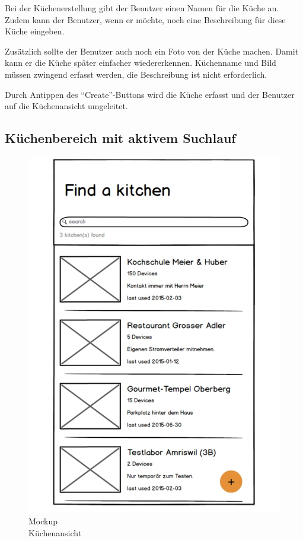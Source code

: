 Bei der Küchenerstellung gibt der Benutzer einen Namen für die Küche an. Zudem kann der Benutzer, wenn er möchte, noch eine Beschreibung für diese Küche eingeben.

Zusätzlich sollte der Benutzer auch noch ein Foto von der Küche machen. Damit kann er die Küche später einfacher wiedererkennen. Küchenname und Bild müssen zwingend erfasst werden, die Beschreibung ist nicht erforderlich.

Durch Antippen des \enquote{Create}-Buttons wird die Küche erfasst und der Benutzer auf die Küchenansicht umgeleitet.

\WFclear

\subsection{Küchenbereich mit aktivem Suchlauf}
\label{subsec:Küchenbereich mit aktivem Suchlauf}

\begin{figure}
	\includegraphics[page=4,trim=0 0 0 0,clip,scale=0.21]{uiux/res/mockups}
	\caption{Mockup\\Küchenansicht}
    \label{abb:mockKitchenView}
\end{figure}

